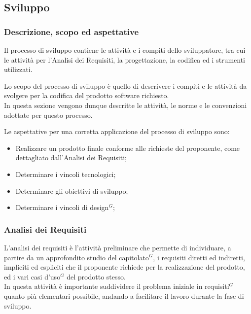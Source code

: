 \subsection{Sviluppo}

\subsubsection{Descrizione, scopo ed aspettative}

Il processo di sviluppo contiene le attività e i compiti dello sviluppatore, tra cui le attività per l’Analisi dei Requisiti, la progettazione, la codifica ed i strumenti utilizzati.

Lo scopo del processo di sviluppo è quello di descrivere i compiti e le attività da svolgere per la codifica del prodotto software richiesto. \\
In questa sezione vengono dunque descritte le attività, le norme e le convenzioni adottate per questo processo.

Le aspettative per una corretta applicazione del processo di sviluppo sono:
\begin{itemize}
    \item Realizzare un prodotto finale conforme alle richieste del proponente, come dettagliato dall'Analisi dei Requisiti;
    \item Determinare i vincoli tecnologici;
    \item Determinare gli obiettivi di sviluppo;
    \item Determinare i vincoli di design$^{G}$;
\end{itemize}
\subsubsection{Analisi dei Requisiti}


L’analisi dei requisiti è l’attività preliminare che permette di individuare, a partire da un approfondito studio del capitolato$^{G}$, i requisiti diretti ed indiretti, 
impliciti ed espliciti che il proponente richiede per la realizzazione del prodotto, ed i vari casi d’uso$^{G}$ del prodotto stesso. \\
In questa attività è importante suddividere il problema iniziale in requisiti$^{G}$ quanto più elementari possibile, andando a facilitare il lavoro durante la fase di sviluppo.






 